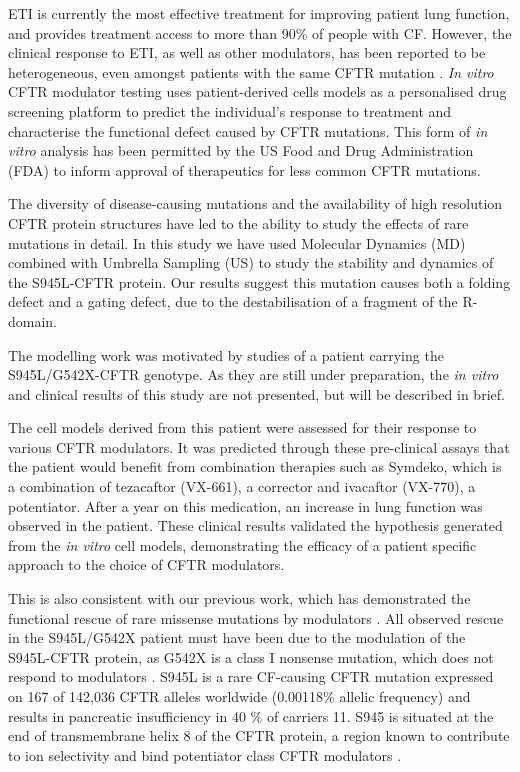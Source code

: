 ETI is currently the most effective treatment for improving patient lung function, \cite{rowe2017,keating2018} and provides treatment access to more than 90\% of people with CF. However, the clinical response to ETI, as well as other modulators, has been reported to be heterogeneous, even amongst patients with the same CFTR mutation \cite{wainwright2015, boyle2014}. \textit{In vitro} CFTR modulator testing uses patient-derived cells models as a personalised drug screening platform to predict the individual’s response to treatment and characterise the functional defect caused by CFTR mutations. This form of \textit{in vitro} analysis has been permitted by the US Food and Drug Administration (FDA) to inform approval of therapeutics for less common CFTR mutations. 

The diversity of disease-causing mutations and the availability of high resolution CFTR protein structures have led to the ability to study the effects of rare mutations in detail. In this study we have used Molecular Dynamics (MD) combined with Umbrella Sampling (US) to study the stability and dynamics of the S945L-CFTR protein. Our results suggest this mutation causes both a folding defect and a gating defect, due to the destabilisation of a fragment of the R-domain. 

The modelling work was motivated by studies of a patient carrying the S945L/G542X-CFTR genotype. As they are still under preparation, the \textit{in vitro} and clinical results of this study are not presented, but will be described in brief.

The cell models derived from this patient were assessed for their response to various CFTR modulators. It was predicted through these pre-clinical assays that the patient would benefit from combination therapies such as Symdeko, which is a combination of tezacaftor (VX-661), a corrector and ivacaftor (VX-770), a potentiator. After a year on this medication, an increase in lung function was observed in the patient. These clinical results validated the hypothesis generated from the \textit{in vitro} cell models, demonstrating the efficacy of a patient specific approach to the choice of CFTR modulators.

This is also consistent with our previous work, which has demonstrated the functional rescue of rare missense mutations by modulators . All observed rescue in the S945L/G542X patient must have been due to the modulation of the S945L-CFTR protein, as G542X is a class I nonsense mutation, which does not respond to modulators  \cite{hamosh1992, valley2019}. S945L is a rare CF-causing CFTR mutation expressed on 167 of 142,036 CFTR alleles worldwide (0.00118\% allelic frequency) and results in pancreatic insufficiency in 40 \% of carriers 11. S945 is situated at the end of transmembrane helix 8 of the CFTR protein, a region known to contribute to ion selectivity \cite{negoda2019} and bind potentiator class CFTR modulators \cite{liu2019}. 


